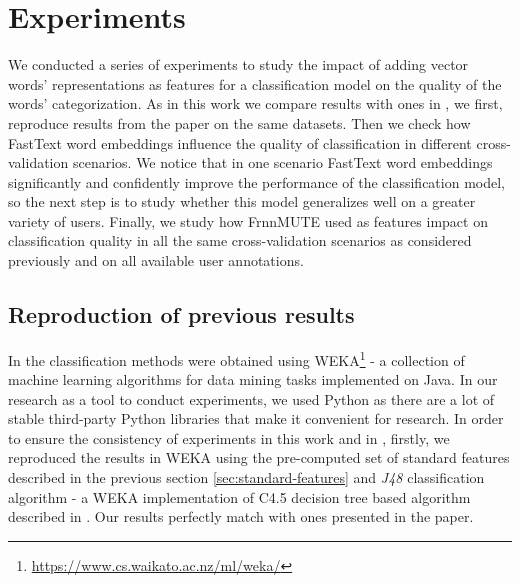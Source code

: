 \chapter{Experiments}
\label{ch:experiments}




We conducted a series of experiments to study the impact of adding vector words' representations as features for a classification model on the quality of the words' categorization. As in this work we compare results with ones in \citep{Grabar-PITR2014}, we first, reproduce results from the paper on the same datasets. Then we check how FastText word embeddings influence the quality of classification in different cross-validation scenarios. We notice that in one scenario FastText word embeddings significantly and confidently improve the performance of the classification model, so the next step is to study whether this model generalizes well on a greater variety of users. Finally, we study how FrnnMUTE used as features impact on classification quality in all the same cross-validation scenarios as considered previously and on all available user annotations.

\section{Reproduction of previous results}

In \citep{Grabar-PITR2014} the classification methods were obtained using WEKA\footnote{\url{https://www.cs.waikato.ac.nz/ml/weka/}} - a collection of machine learning algorithms for data mining tasks implemented on Java. In our research as a tool to conduct experiments, we used Python as there are a lot of stable third-party Python libraries that make it convenient for research. In order to ensure the consistency of experiments in this work and in \citep{Grabar-PITR2014}, firstly, we reproduced the results in WEKA using the pre-computed set of standard features described in the previous section \ref{sec:standard-features} and \textit{J48} classification algorithm - a WEKA implementation of C4.5 decision tree based algorithm described in \cite{Quinlan1993}. Our results perfectly match with ones presented in the paper. 

